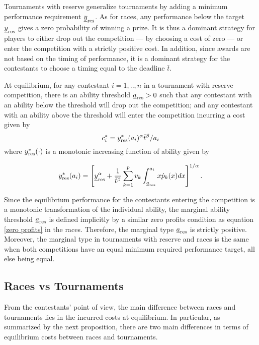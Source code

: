 \documentclass[11pt, titlepage]{article}
\newcommand\deadline{\bar{t}}
\newcommand\target{\underline{y}}
\begin{document}
Tournaments with reserve generalize tournaments by adding a minimum
performance requirement \(\target_{\reserve}\). As for races, any
performance below the target \(\target_{\reserve}\) gives a zero
probability of winning a prize. It is thus a dominant strategy for
players to either drop out the competition --- by choosing a cost of
zero --- or enter the competition with a strictly positive cost. In
addition, since awards are not based on the timing of performance, it is
a dominant strategy for the contestants to choose a timing equal to the
deadline \(\deadline\).

At equilibrium, for any contestant \(i=1, .., n\) in a tournament with
reserve competition, there is an ability threshold
\(\underline{a}_{\text{res}}>0\) such that any contestant with an ability below
the threshold will drop out the competition; and any contestant with an
ability above the threshold will enter the competition incurring a cost
given by \[
    c_i^* = y_\reserve^*(a_i)^\alpha \deadline^\beta / a_i
\] where \(y_{\text{res}}^*(\cdot)\) is a monotonic increasing function of
ability given by

\begin{equation}
        y_\reserve^*(a_i) = \left[
            \target_{\reserve}^\alpha + \frac{1}{\deadline^\beta}\sum_{k=1}^{p} v_k \int_{\marginal_\reserve}^{a_i} x \dot p_k(x) d x
        \right]^{1/\alpha}.
\end{equation}

Since the equilibrium performance for the contestants entering the
competition is a monotonic transformation of the individual ability, the
marginal ability threshold \(\underline{a}_{\text{res}}\) is defined implicitly
by a similar zero profits condition as equation \eqref{zero profits} in
the races. Therefore, the marginal type \(\underline{a}_{\text{res}}\) is
strictly positive. Moreover, the marginal type in tournaments with
reserve and races is the same when both competitions have an equal
minimum required performance target, all else being equal.

\subsection{Races vs Tournaments}\label{races-vs-tournaments}

From the contestants' point of view, the main difference between races
and tournaments lies in the incurred costs at equilibrium. In
particular, as summarized by the next proposition, there are two main
differences in terms of equilibrium costs between races and tournaments.
\end{document}
